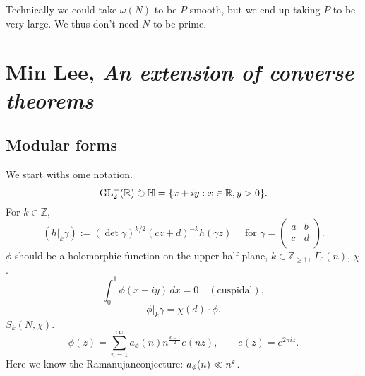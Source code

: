 \documentclass[reqno]{amsart} 
\begin{document}
\begin{remark}
Technically we could take $\omega(N)$ to be $P$-smooth, but we end up taking $P$ to be very large.  We thus don't need $N$ to be prime.
\end{remark}

\section{Min Lee, \emph{An extension of converse theorems}}

\subsection{Modular forms}
We start withs ome notation.
\begin{equation*}
  \operatorname{GL}_2^+(\mathbb{R}) \circlearrowright \mathbb{H} = \{x + i y : x \in \mathbb{R}, y > 0\}.
\end{equation*}
For $k \in \mathbb{Z}$,
\begin{equation*}
  \left( h |_k \gamma  \right)
  :=
  \left( \det \gamma  \right)^{k / 2 }
  \left( c z + d  \right)^{- k}
  h (\gamma z)
  \quad \text{ for }
  \gamma =
  \begin{pmatrix}
    a & b \\
    c & d \\
  \end{pmatrix}.
\end{equation*}
$\phi$ should be a holomorphic function on the upper half-plane, $k \in \mathbb{Z}_{\geq 1}$, $\Gamma_0(n)$, $\chi$.
\begin{equation*}
  \int_0^1 \phi (x + i y ) \, d x
  = 0 \quad (\text{cuspidal}),
\end{equation*}
\begin{equation*}
  \phi |_k \gamma = \chi(d) \cdot \phi.
\end{equation*}
$S_k(N,\chi)$.
\begin{equation*}
  \phi (z) = \sum_{n = 1}^\infty a_\phi (n) n^{\frac{k - 1}{2}} e (n z),
  \qquad
  e (z) = e^{2 \pi i z}.
\end{equation*}
Here we know the Ramanujanconjecture: $a_\phi (n) \ll n^\varepsilon $.
\end{document}
